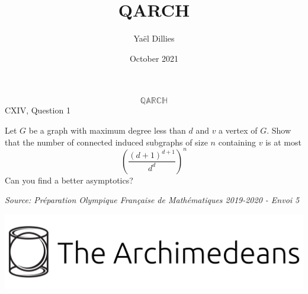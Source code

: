 \documentclass{article}
\title{QARCH}
\author{Yaël Dillies}
\date{October 2021}
\begin{document}
\begin{tcolorbox}[colback = white]

\graphicspath{{..}}

\Huge{$$\mathbb{QARCH}$$}
\centering
\vspace{5pt}
\large
CXIV, Question 1


\vspace{45pt}
\Large

Let $G$ be a graph with maximum degree less than $d$ and $v$ a vertex of $G$. Show that the number of connected induced subgraphs of size $n$ containing $v$ is at most
$$\left(\frac{(d + 1)^{d + 1}}{d^d}\right)^n$$
Can you find a better asymptotics?

\vspace{45pt}
\normalsize
\textit{Source: Préparation Olympique Française de Mathématiques 2019-2020 - Envoi 5}

\vspace{5pt}
\includegraphics[scale = 0.01]{archim_logo_text.png}
\end{tcolorbox}
\end{document}
